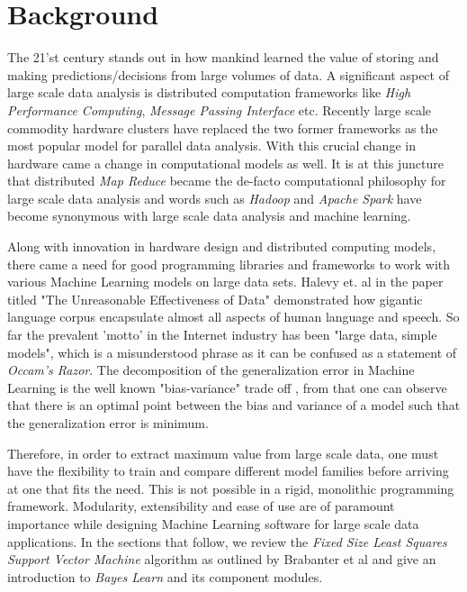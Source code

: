 \documentclass[
    ,final            %
  ]
  {aipproc}
\begin{document}
\maketitle


\section{Background}

The 21'st century stands out in how mankind learned the value of storing and making predictions/decisions from large volumes of data. A significant aspect of large scale data analysis is distributed computation frameworks like \textit{High Performance Computing}, \textit{Message Passing Interface} etc. Recently large scale commodity hardware clusters have replaced the two former frameworks as the most popular model for parallel data analysis. With this crucial change in hardware came a change in computational models as well. It is at this juncture that distributed \textit{Map Reduce} became the de-facto computational philosophy for large scale data analysis and  words such as \textit{Hadoop} and \textit{Apache Spark} have become synonymous with large scale data analysis and machine learning.

Along with innovation in hardware design and distributed computing models, there came a need for good programming libraries and frameworks to work with various Machine Learning models on large data sets. Halevy et. al \cite{10.1109/MIS.2009.36} in the paper titled "The Unreasonable Effectiveness of Data" demonstrated how gigantic language corpus encapsulate almost all aspects of human language and speech. So far the prevalent 'motto' in the Internet industry has been "large data, simple models", which is a misunderstood phrase as it can be confused as a statement of \textit{Occam's Razor}. The decomposition of the generalization error in Machine Learning is the well known "bias-variance" trade off \cite{Valentini2004}, from that one can observe that there is an optimal point between the bias and variance of a model such that the generalization error is minimum.

Therefore, in order to extract maximum value from large scale data, one must have the flexibility to train and compare different model families before arriving at one that fits the need. This is not possible in a rigid, monolithic programming framework. Modularity, extensibility and ease of use are of paramount importance while designing Machine Learning software for large scale data applications. In the sections that follow, we review the \textit{Fixed Size Least Squares Support Vector Machine} algorithm as outlined by Brabanter et al \cite{DeBrabanter2010} and give an introduction to \textit{Bayes Learn} and its component modules.
\end{document}
